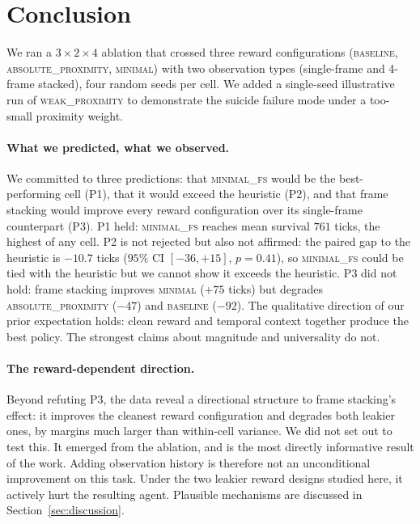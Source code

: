\documentclass[12pt,a4paper,titlepage]{article}
\begin{document}
\section{Conclusion}
\label{sec:conclusion}

We ran a $3 \times 2 \times 4$ ablation that crossed three reward configurations (\textsc{baseline}, \textsc{absolute\_proximity}, \textsc{minimal}) with two observation types (single-frame and 4-frame stacked), four random seeds per cell. We added a single-seed illustrative run of \textsc{weak\_proximity} to demonstrate the suicide failure mode under a too-small proximity weight.

\paragraph{What we predicted, what we observed.}
We committed to three predictions: that \textsc{minimal\_fs} would be the best-performing cell (P1), that it would exceed the heuristic (P2), and that frame stacking would improve every reward configuration over its single-frame counterpart (P3). P1 held: \textsc{minimal\_fs} reaches mean survival $761$ ticks, the highest of any cell. P2 is not rejected but also not affirmed: the paired gap to the heuristic is $-10.7$ ticks ($95\%$ CI $[-36, +15]$, $p = 0.41$), so \textsc{minimal\_fs} could be tied with the heuristic but we cannot show it exceeds the heuristic. P3 did not hold: frame stacking improves \textsc{minimal} ($+75$ ticks) but degrades \textsc{absolute\_proximity} ($-47$) and \textsc{baseline} ($-92$). The qualitative direction of our prior expectation holds: clean reward and temporal context together produce the best policy. The strongest claims about magnitude and universality do not.

\paragraph{The reward-dependent direction.}
Beyond refuting P3, the data reveal a directional structure to frame stacking's effect: it improves the cleanest reward configuration and degrades both leakier ones, by margins much larger than within-cell variance. We did not set out to test this. It emerged from the ablation, and is the most directly informative result of the work. Adding observation history is therefore not an unconditional improvement on this task. Under the two leakier reward designs studied here, it actively hurt the resulting agent. Plausible mechanisms are discussed in Section~\ref{sec:discussion}.
\end{document}
